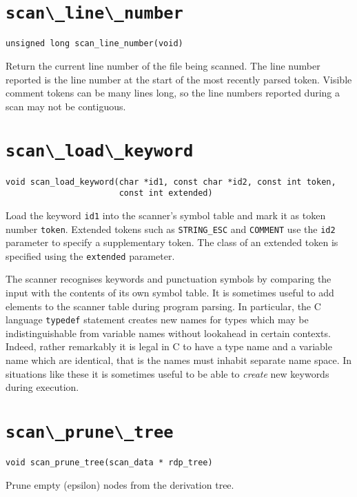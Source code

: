 \section{\protect\verb+scan\_line\_number+}
\begin{verbatim}
unsigned long scan_line_number(void)
\end{verbatim}
Return the current line number of the file being scanned. The line number
reported is the line number at the start of the most recently parsed token.
Visible comment tokens can be many lines long, so the line numbers reported
during a scan may not be contiguous.

\section{\protect\verb+scan\_load\_keyword+}
\begin{verbatim}
void scan_load_keyword(char *id1, const char *id2, const int token,
                       const int extended)
\end{verbatim}
Load the keyword {\tt id1} into the scanner's symbol table and mark it
as token number {\tt token}. Extended tokens such as \verb+STRING_ESC+
and \verb+COMMENT+ use the {\tt id2} parameter to specify a
supplementary token. The class of an extended token is specified using
the {\tt extended} parameter.

The scanner recognises keywords and punctuation symbols by comparing the
input with the contents of its own symbol table. It is sometimes useful
to add elements to the scanner table during program parsing. In
particular, the C language {\tt typedef} statement creates new names for
types which may be indistinguishable from variable names without
lookahead in certain contexts. Indeed, rather remarkably it is legal in
C to have a type name and a variable name which are identical, that is
the names must inhabit separate name space. In situations like these it
is sometimes useful to be able to {\em create} new keywords during
execution.


\section{\protect\verb+scan\_prune\_tree+}
\begin{verbatim}
void scan_prune_tree(scan_data * rdp_tree)
\end{verbatim}
Prune empty (epsilon) nodes from the derivation tree.

